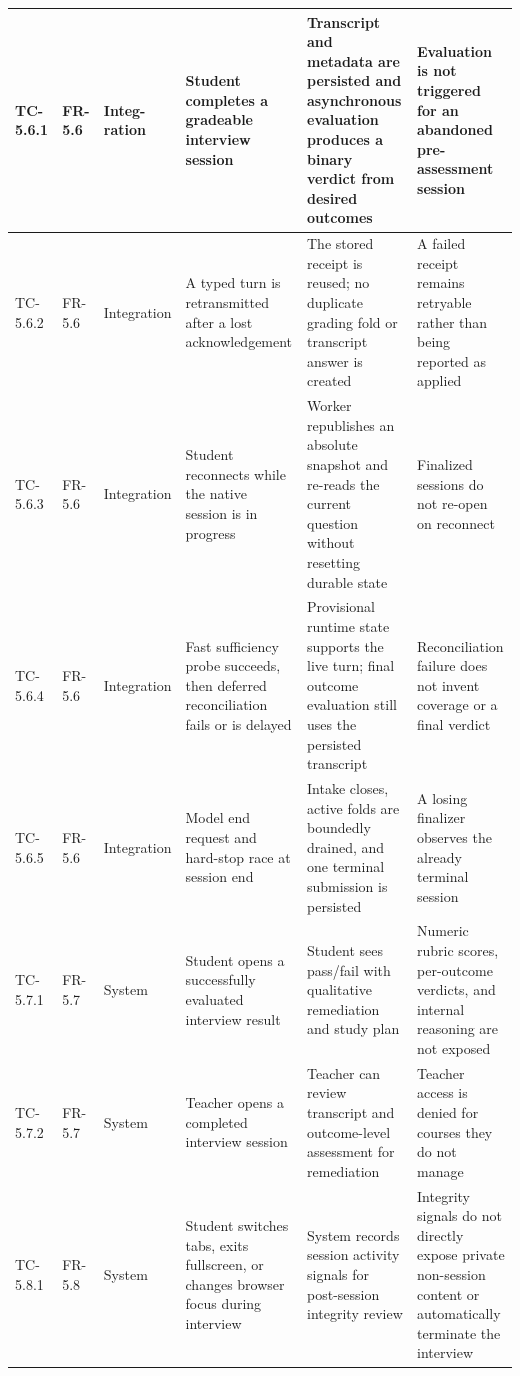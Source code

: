 \begin{longtable}{|>{\centering\arraybackslash}m{}|>{\centering\arraybackslash}m{}|>{\centering\arraybackslash}m{}|m{}|m{}|m{}|}
TC-5.6.1 & FR-5.6 & Integ-ration & Student completes a gradeable interview session & Transcript and metadata are persisted and asynchronous evaluation produces a binary verdict from desired outcomes & Evaluation is not triggered for an abandoned pre-assessment session \\ \hline
TC-5.6.2 & FR-5.6 & Integration & A typed turn is retransmitted after a lost acknowledgement & The stored receipt is reused; no duplicate grading fold or transcript answer is created & A failed receipt remains retryable rather than being reported as applied \\ \hline
TC-5.6.3 & FR-5.6 & Integration & Student reconnects while the native session is in progress & Worker republishes an absolute snapshot and re-reads the current question without resetting durable state & Finalized sessions do not re-open on reconnect \\ \hline
TC-5.6.4 & FR-5.6 & Integration & Fast sufficiency probe succeeds, then deferred reconciliation fails or is delayed & Provisional runtime state supports the live turn; final outcome evaluation still uses the persisted transcript & Reconciliation failure does not invent coverage or a final verdict \\ \hline
TC-5.6.5 & FR-5.6 & Integration & Model end request and hard-stop race at session end & Intake closes, active folds are boundedly drained, and one terminal submission is persisted & A losing finalizer observes the already terminal session \\ \hline

TC-5.7.1 & FR-5.7 & System & Student opens a successfully evaluated interview result & Student sees pass/fail with qualitative remediation and study plan & Numeric rubric scores, per-outcome verdicts, and internal reasoning are not exposed \\ \hline
TC-5.7.2 & FR-5.7 & System & Teacher opens a completed interview session & Teacher can review transcript and outcome-level assessment for remediation & Teacher access is denied for courses they do not manage \\ \hline

TC-5.8.1 & FR-5.8 & System & Student switches tabs, exits fullscreen, or changes browser focus during interview & System records session activity signals for post-session integrity review & Integrity signals do not directly expose private non-session content or automatically terminate the interview \\ \hline


\end{longtable}
